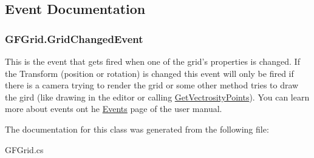 \subsection{Event Documentation}
\hypertarget{class_g_f_grid_af3bfbed41ba24f963e871921c663f1f8_af3bfbed41ba24f963e871921c663f1f8}{
\subsubsection[{Grid\+Changed\+Event}]{ G\+F\+Grid.\+Grid\+Changed\+Event}}\label{class_g_f_grid_af3bfbed41ba24f963e871921c663f1f8_af3bfbed41ba24f963e871921c663f1f8}
This is the event that gets fired when one of the grid's properties is changed. If the Transform (position or rotation) is changed this event will only be fired if there is a camera trying to render the grid or some other method tries to draw the gird (like drawing in the editor or calling \hyperlink{class_g_f_grid_a21a5ed4cfa330e04e6ce8c951744b839_a21a5ed4cfa330e04e6ce8c951744b839}{Get\+Vectrosity\+Points}). You can learn more about events ont he \hyperlink{events}{Events} page of the user manual. 

The documentation for this class was generated from the following file\+:\begin{DoxyCompactItemize}
\item 
G\+F\+Grid.\+cs\end{DoxyCompactItemize}
